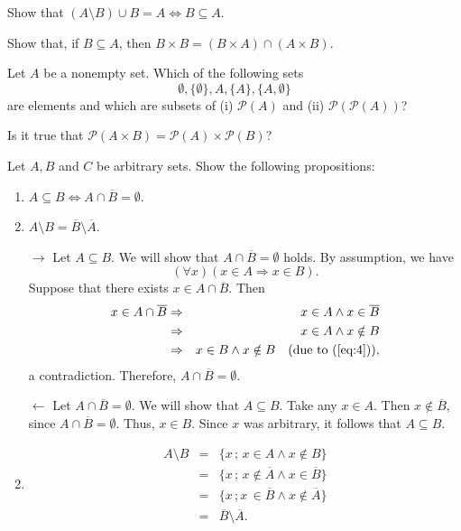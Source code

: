 \documentclass[11pt,paper=b5,footinclude,headinclude]{scrbook} %
\theoremstyle{remark}
\theoremstyle{definition} %
\theoremstyle{theorem} %
\newtheorem{ex}{Exercise\hypertarget{sol:\theex}}[chapter]
\begin{document}
\begin{ex}
    Show that $(A\setminus B) \cup B = A \Leftrightarrow B \subseteq A$.
\end{ex}
\begin{ex}
    Show that, if $B\subseteq A$, then $B\times B = (B\times A)\cap (A\times B)$.
\end{ex}
\begin{ex}
    Let $A$ be a nonempty set. Which of the following sets 
$$\emptyset,\{\emptyset\}, A, \{A\}, \{A,\emptyset\}$$
are elements and which are subsets of (i) $\mathcal{P}(A)$ and (ii) $\mathcal{P}(\mathcal{P}(A))$?
\end{ex}
\begin{ex}
    Is it true that  $\mathcal{P}(A\times B) = \mathcal{P}(A) \times \mathcal{P}(B)$?
\end{ex}
\begin{ex}
    Let $A, B$ and $C$ be arbitrary sets. Show the following propositions:
\begin{enumerate}
\item  $A\subseteq B \Leftrightarrow A \cap \overline{B} = \emptyset$.
\item  $A\setminus B = \overline{B}\setminus \overline{A}$.
\end{enumerate}
\begin{sol}
    \begin{enumerate}
\item[$\rightarrow$]  
Let $A\subseteq B$. 
We will show that $A\cap \overline{B} = \emptyset$ holds. By assumption, we have 
\begin{equation}\label{eq:4}
(\forall x)(x\in A \Rightarrow x\in B).
\end{equation}
Suppose that there exists $x\in A\cap \overline{B}$. Then
\begin{eqnarray*}
x\in A\cap \overline{B} &\Rightarrow & x\in A \wedge x\in \overline{B}\\
						&\Rightarrow & x\in A \wedge x \notin B\\
						&\Rightarrow & x\in B \wedge x \notin B \quad (\textrm{due to } (\ref{eq:4})),
\end{eqnarray*}
a contradiction. Therefore, $A\cap \overline{B}=\emptyset$.

$\leftarrow$ Let $A\cap \overline{B}=\emptyset$. We will show that $A\subseteq B$. Take any $x\in A$. Then $x\notin \overline{B}$, since $A\cap \overline{B}=\emptyset$. Thus, $x\in B$. Since $x$ was arbitrary, it follows that $A\subseteq B$.

\item
\begin{eqnarray*}
A\setminus B & = & \{x\, ;\, x\in A \wedge x\notin B \}\\
             & = & \{x\, ;\, x\notin \overline{A} \wedge x  \in \overline{B} \}\\
             & = & \{x\, ; x\,  \in \overline{B} \wedge  x\notin \overline{A} \}\\
             & = & \overline{B} \setminus \overline{A}.
\end{eqnarray*}


\end{enumerate}
\end{sol}
\end{ex}
\end{document}
